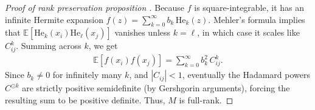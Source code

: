 \documentclass[11pt]{article}
\newcommand{\He}{\mathrm{He}}
\begin{document}
\begin{proof}[Proof of rank preservation proposition ]
Because $f$ is square-integrable, it has an infinite Hermite expansion $f(z)=\sum_{k=0}^{\infty} b_k\, \He_k(z)$. Mehler's formula implies that $\mathbb{E}[\He_k(x_i)\He_\ell(x_j)]$ vanishes unless $k=\ell$, in which case it scales like $C_{ij}^k$. Summing across $k$, we get 
\begin{align*}
\mathbb{E}[f(x_i)f(x_j)] 
= 
\sum_{k=0}^{\infty} b_k^2\,C_{ij}^k.
\end{align*}
Since $b_k\neq 0$ for infinitely many $k$, and $|C_{ij}|<1$, eventually the Hadamard powers $C^{\odot k}$ are strictly positive semidefinite (by Gershgorin arguments), forcing the resulting sum to be positive definite. Thus, $M$ is full-rank.
\end{proof}
\end{document}
